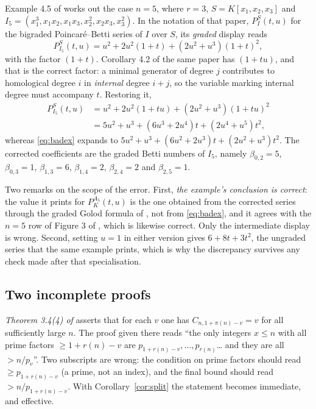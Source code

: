 \documentclass[a4paper,11pt,oneside,reqno]{amsart}
\theoremstyle{definition}
\theoremstyle{remark}
\theoremstyle{plain}
\begin{document}
Example 4.5 of \cite{Snellman2000} works out the case \(n = 5\), where \(r = 3\),
\(S = K[x_1,x_2,x_3]\) and
\(I_5 = (x_1^{3},x_1x_2,x_1x_3,x_2^{2},x_2x_3,x_3^{2})\). In the notation of that
paper, \(P^{S}_{I}(t,u)\) for the bigraded Poincaré--Betti series of \(I\) over
\(S\), its \emph{graded} display reads
\begin{equation}\label{eq:badex}
  P^{S}_{I_5}(t,u) = u^{2}+2u^{2}(1+t)+(2u^{2}+u^{3})(1+t)^{2},
\end{equation}
with the factor \((1+t)\). Corollary 4.2 of the same paper has \((1+tu)\), and
that is the correct factor: a minimal generator of degree \(j\) contributes to
homological degree \(i\) in \emph{internal} degree \(i+j\), so the variable
marking internal degree must accompany \(t\). Restoring it,
\begin{equation}\label{eq:goodex}
\begin{split}
  P^{S}_{I_5}(t,u) &= u^{2}+2u^{2}(1+tu)+(2u^{2}+u^{3})(1+tu)^{2}\\
    &= 5u^{2}+u^{3}+(6u^{3}+2u^{4})t+(2u^{4}+u^{5})t^{2},
\end{split}
\end{equation}
whereas \eqref{eq:badex} expands to
\(5u^{2}+u^{3}+(6u^{2}+2u^{3})t+(2u^{2}+u^{3})t^{2}\). The corrected
coefficients are the graded Betti numbers of \(I_5\), namely
\(\beta_{0,2} = 5\), \(\beta_{0,3} = 1\), \(\beta_{1,3} = 6\), \(\beta_{1,4} = 2\),
\(\beta_{2,4} = 2\) and \(\beta_{2,5} = 1\).

Two remarks on the scope of the error. First, \emph{the example's conclusion is
correct}: the value it prints for \(P^{A_5}_{K}(t,u)\) is the one obtained from
the corrected series through the graded Golod formula of
\cite[Cor.~4.4]{Snellman2000}, not from \eqref{eq:badex}, and it agrees with
the \(n = 5\) row of Figure 3 of \cite{Snellman2000}, which is likewise correct.
Only the intermediate display is wrong. Second, setting \(u = 1\) in either
version gives \(6+8t+3t^{2}\), the ungraded series that the same example
prints, which is why the discrepancy survives any check made after that
specialisation.

\subsection{Two incomplete proofs}

\emph{Theorem 3.4(4) of \cite{Snellman2000}} asserts that for each \(v\) one has
\(C_{n,1+\pi(n)-v} = v\) for all sufficiently large \(n\). The proof given there
reads ``the only integers \(x \le n\) with all prime factors \(\ge 1+r(n)-v\) are
\(p_{1+r(n)-v},\dots,p_{r(n)}\)\dots{} and they are all \(>n/p_v\)''. Two
subscripts are wrong: the condition on prime factors should read
\(\ge p_{1+r(n)-v}\) (a prime, not an index), and the final bound should read
\(>n/p_{1+r(n)-v}\). With Corollary~\ref{cor:split} the statement becomes
immediate, and effective.
\end{document}
